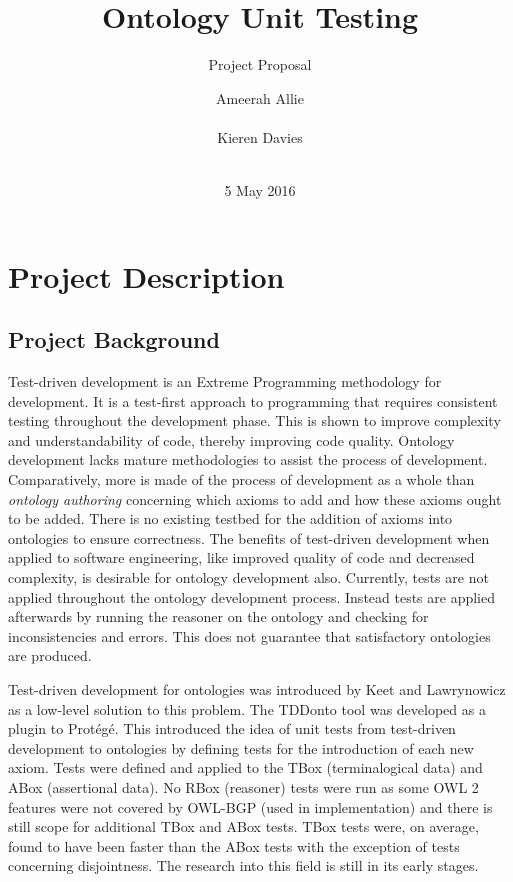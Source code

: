 \documentclass[draft]{sig-alternate}
\begin{document}
\title{Ontology Unit Testing}
\subtitle{Project Proposal}
\author{
  \alignauthor
  Ameerah Allie\\
    \\
  \alignauthor
  Kieren Davies\\
   \\
}
\date{5 May 2016}
\maketitle

\section{Project Description}

\subsection{Project Background}

Test-driven development is an Extreme Programming methodology for development. It is a test-first approach to programming that requires consistent testing throughout the development phase. This is shown to improve complexity and understandability of code, thereby improving code quality. Ontology development lacks mature methodologies to assist the process of development. Comparatively, more is made of the process of development as a whole than \textit{ontology authoring} concerning which axioms to add and how these axioms ought to be added. There is no existing testbed for the addition of axioms into ontologies to ensure correctness. The benefits of test-driven development when applied to software engineering, like improved quality of code and decreased complexity, is desirable for ontology development also. Currently, tests are not applied throughout the ontology development process. Instead tests are applied afterwards by running the reasoner on the ontology and checking for inconsistencies and errors. This does not guarantee that satisfactory ontologies are produced.

Test-driven development for ontologies was introduced by Keet and Lawrynowicz\cite{DBLP:journals/corr/KeetL15} as a low-level solution to this problem. The TDDonto tool was developed as a plugin to Prot{\'e}g{\'e}\cite{DBLP:conf/dlog/LawrynowiczK16}. This introduced the idea of unit tests from test-driven development to ontologies by defining tests for the introduction of each new axiom. Tests were defined and applied to the TBox (terminalogical data) and ABox (assertional data). No RBox (reasoner) tests were run as some OWL 2 features were not covered by OWL-BGP (used in implementation) and there is still scope for additional TBox and ABox tests. TBox tests were, on average, found to have been faster than the ABox tests with the exception of tests concerning disjointness. The research into this field is still in its early stages.
\end{document}

